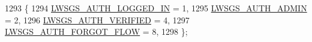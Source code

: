 \begin{DoxyCode}
1293                      \{
1294         \hyperlink{group__generic-sessions_gga7c2dc7bfb4ccb91c5d771f9e9ea237e1a81e63075115dedd150265d81b8f7fa57}{LWSGS\_AUTH\_LOGGED\_IN} = 1, 
1295         \hyperlink{group__generic-sessions_gga7c2dc7bfb4ccb91c5d771f9e9ea237e1a0657a9e846814781b128c397fe4b10bf}{LWSGS\_AUTH\_ADMIN} = 2,   
1296         \hyperlink{group__generic-sessions_gga7c2dc7bfb4ccb91c5d771f9e9ea237e1a5a607e4668d20cadada62c4b8007f887}{LWSGS\_AUTH\_VERIFIED} = 4,  
1297         \hyperlink{group__generic-sessions_gga7c2dc7bfb4ccb91c5d771f9e9ea237e1a2cd8fb86e3b85c106e7711c03f0ddd0a}{LWSGS\_AUTH\_FORGOT\_FLOW} = 8,       
1298 \};
\end{DoxyCode}
